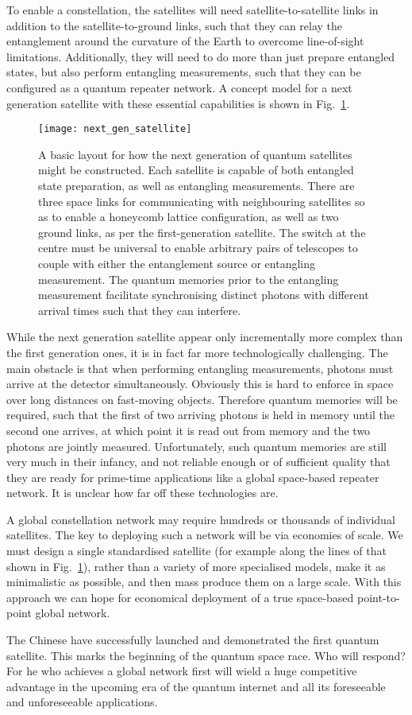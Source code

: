 To enable a constellation, the satellites will need satellite-to-satellite links in addition to the satellite-to-ground links, such that they can relay the entanglement around the curvature of the Earth to overcome line-of-sight limitations. Additionally, they will need to do more than just prepare entangled states, but also perform entangling measurements, such that they can be configured as a quantum repeater network. A concept model for a next generation satellite with these essential capabilities is shown in Fig.~\ref{fig:next_gen_sat}.

\begin{figure}[!htb]
\texttt{[image: next\_gen\_satellite]}
\caption{A basic layout for how the next generation of quantum satellites might be constructed. Each satellite is capable of both entangled state preparation, as well as entangling measurements. There are three space links for communicating with neighbouring satellites so as to enable a honeycomb lattice configuration, as well as two ground links, as per the first-generation satellite. The switch at the centre must be universal to enable arbitrary pairs of telescopes to couple with either the entanglement source or entangling measurement. The quantum memories prior to the entangling measurement facilitate synchronising distinct photons with different arrival times such that they can interfere.}\label{fig:next_gen_sat}	
\end{figure}

While the next generation satellite appear only incrementally more complex than the first generation ones, it is in fact far more technologically challenging. The main obstacle is that when performing entangling measurements, photons must arrive at the detector simultaneously. Obviously this is hard to enforce in space over long distances on fast-moving objects. Therefore quantum memories will be required, such that the first of two arriving photons is held in memory until the second one arrives, at which point it is read out from memory and the two photons are jointly measured. Unfortunately, such quantum memories are still very much in their infancy, and not reliable enough or of sufficient quality that they are ready for prime-time applications like a global space-based repeater network. It is unclear how far off these technologies are.

A global constellation network may require hundreds or thousands of individual satellites. The key to deploying such a network will be via economies of scale. We must design a single standardised satellite (for example along the lines of that shown in Fig.~\ref{fig:next_gen_sat}), rather than a variety of more specialised models, make it as minimalistic as possible, and then mass produce them on a large scale. With this approach we can hope for economical deployment of a true space-based point-to-point global network.

The Chinese have successfully launched and demonstrated the first quantum satellite. This marks the beginning of the quantum space race. Who will respond? For he who achieves a global network first will wield a huge competitive advantage in the upcoming era of the quantum internet and all its foreseeable and unforeseeable applications.